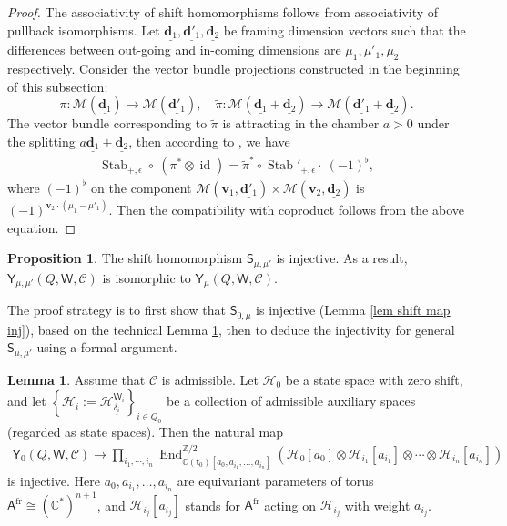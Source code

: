 \documentclass[10pt]{amsart}
\theoremstyle{definition}
\newtheorem{Proposition}[Theorem]{Proposition}
\newtheorem{Lemma}[Theorem]{Lemma}
\numberwithin{equation}{section}
\newcommand{\bC}{\mathbb{C}}
\newcommand{\bZ}{\mathbb{Z}}
\newcommand{\bv}{\mathbf{v}}
\newcommand{\bd}{\mathbf{d}}
\newcommand{\cH}{\mathcal{H}}
\newcommand{\cM}{\mathcal{M}}
\newcommand{\loc}{\mathrm{loc}}
\newcommand{\sS}{\mathsf{S}}
\newcommand{\sW}{\mathsf{W}}
\newcommand{\End}{\operatorname{End}}
\newcommand{\Stab}{\operatorname{Stab}}
\newcommand{\id}{\operatorname{id}}
\begin{document}
\begin{proof}
The associativity of shift homomorphisms follows from associativity of pullback isomorphisms. Let $\underline{\bd_1},\underline{\bd'_1},\underline{\bd_2}$ be framing dimension vectors such that the differences between out-going and in-coming dimensions are $\mu_1,\mu'_1,\mu_2$ respectively. Consider the vector bundle projections constructed in the beginning of this subsection: 
$$\pi\colon \cM(\underline{\bd_1})\to \cM(\underline{\bd'_1}), \quad \widetilde{\pi}\colon \cM(\underline{\bd_1}+\underline{\bd_2})\to \cM(\underline{\bd'_1}+\underline{\bd_2}).$$  The vector bundle corresponding to $\widetilde{\pi}$ is attracting in the chamber $a>0$ under the splitting $a\underline{\bd_1}+\underline{\bd_2}$, then according to \cite[Prop.~8.2]{COZZ}, we have
\begin{align*}
    \Stab_{+,\epsilon}\circ \:(\pi^*\otimes\id) = \widetilde{\pi}^*\circ\Stab'_{+,\epsilon}\cdot \:(-1)^{\flat},
\end{align*}
where $(-1)^{\flat}$ on the component $\cM(\bv_1,\underline{\bd'_1})\times \cM(\bv_2,\underline{\bd_2})$ is $(-1)^{\bv_2\cdot (\mu_1-\mu'_1)}$. Then the compatibility with coproduct follows from the above equation.
\end{proof}

\begin{Proposition}\label{prop shift map inj}
The shift homomorphism $\sS_{\mu,\mu'}$ is injective. As a result, $\mathsf Y_{\mu,\mu'}(Q,\sW,\mathcal C)$ is isomorphic to $\mathsf Y_{\mu}(Q,\sW,\mathcal C)$.
\end{Proposition}


The proof strategy is to first show that $\sS_{0,\mu}$ is injective (Lemma \ref{lem shift map inj}), based on the technical Lemma \ref{lem sufficient state spaces}, then to deduce the injectivity for general $\sS_{\mu,\mu'}$ using a formal argument.



\begin{Lemma}\label{lem sufficient state spaces}
Assume that $\mathcal C$ is admissible. Let $\cH_0$ be a state space with zero shift, and let $\left\{\cH_i:=\cH^{\sW_i}_{\underline{\delta_i}}\right\}_{i\in Q_0}$ be a collection of admissible auxiliary spaces (regarded as state spaces). 
Then the natural map
\begin{align*}
    \mathsf Y_0(Q,\sW,\mathcal C)\longrightarrow \prod_{i_1,\cdots,i_n}\End^{\bZ/2}_{\bC(\mathsf t_0)[a_{0},a_{i_1},\ldots,a_{i_n}]}\left(\cH_0[a_0]\otimes\cH_{i_1}[a_{i_1}]\otimes\cdots\otimes \cH_{i_n}[a_{i_n}]\right)
\end{align*}
is injective. Here $a_0,a_{i_1},\ldots,a_{i_n}$ are equivariant parameters of torus $\mathsf A^{\mathrm{fr}}\cong (\bC^*)^{n+1}$, and $\cH_{i_j}[a_{i_j}]$ stands for $\mathsf A^{\mathrm{fr}}$ acting on $\cH_{i_j}$ with weight $a_{i_j}$.
\end{Lemma}
\end{document}
